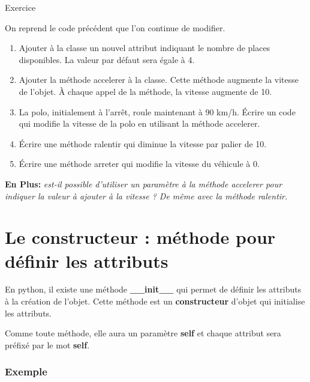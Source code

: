 \documentclass[11pt]{article}
\providecommand{\tightlist}{%
      \setlength{\itemsep}{0pt}\setlength{\parskip}{0pt}}
\begin{document}
\begin{exemple}{Exercice}

On reprend le code précédent que l'on continue de modifier.

\begin{enumerate}
\def\labelenumi{\arabic{enumi}.}
\tightlist
\item
  Ajouter à la classe un nouvel attribut indiquant le nombre de places
  disponibles. La valeur par défaut sera égale à 4.
\item
  Ajouter la méthode accelerer à la classe. Cette méthode augmente la
  vitesse de l'objet. À chaque appel de la méthode, la vitesse augmente
  de 10.
\item
  La polo, initialement à l'arrêt, roule maintenant à 90 km/h. Écrire un
  code qui modifie la vitesse de la polo en utilisant la méthode
  accelerer.
\item
  Écrire une méthode ralentir qui diminue la vitesse par palier de 10.
\item
  Écrire une méthode arreter qui modifie la vitesse du véhicule à 0.
\end{enumerate}

\textbf{En Plus:} \emph{est-il possible d'utiliser un paramètre à la
méthode accelerer pour indiquer la valeur à ajouter à la vitesse ? De
même avec la méthode ralentir.}
\end{exemple}





    \hypertarget{le-constructeur-muxe9thode-pour-duxe9finir-les-attributs}{%
\section{Le constructeur : méthode pour définir les
attributs}\label{le-constructeur-muxe9thode-pour-duxe9finir-les-attributs}}

En python, il existe une méthode \textbf{\_\_init\_\_} qui permet de
définir les attributs à la création de l'objet. Cette méthode est un
\textbf{constructeur} d'objet qui initialise les attributs.

Comme toute méthode, elle aura un paramètre \textbf{self} et chaque
attribut sera préfixé par le mot \textbf{self}.

\hypertarget{exemple}{%
\subsubsection*{Exemple}\label{exemple}}
\end{document}
